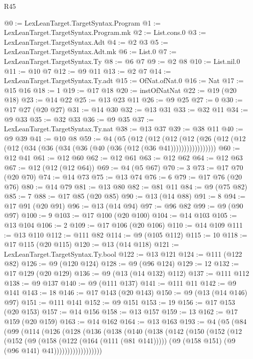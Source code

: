 \begin{lexlean}{R45}
\begin{coremodule}
{{{{{{{{{{{{{{{{{{{{{{{{{{{{{{{{{{{{{{{{{{{{{{{{{{{{{{{{{{{{{{{{{{{{{{{{{{{{{{{{{{{{{{{{{{{@0 := LexLeanTarget.TargetSyntax.Program
@1 := LexLeanTarget.TargetSyntax.Program.mk
@2 := List.cons.{0}
@3 := LexLeanTarget.TargetSyntax.Adt
@4 := @2 @3
@5 := LexLeanTarget.TargetSyntax.Adt.mk
@6 := List.{0}
@7 := LexLeanTarget.TargetSyntax.Ty
@8 := @6 @7
@9 := @2 @8
@10 := List.nil.{0}
@11 := @10 @7
@12 := @9 @11
@13 := @2 @7
@14 := LexLeanTarget.TargetSyntax.Ty.adt
@15 := OfNat.ofNat.{0}
@16 := Nat
@17 := @15 @16
@18 := 1
@19 := @17 @18
@20 := instOfNatNat
@22 := @19 (@20 @18)
@23 := @14 @22
@25 := @13 @23 @11
@26 := @9 @25
@27 := 0
@30 := @17 @27 (@20 @27)
@31 := @14 @30
@32 := @13 @31
@33 := @32 @11
@34 := @9 @33
@35 := @32 @33
@36 := @9 @35
@37 := LexLeanTarget.TargetSyntax.Ty.nat
@38 := @13 @37
@39 := @38 @11
@40 := @9 @39
@41 := @10 @8
@59 := @4
    (@5
      (@12
        (@12
          (@12 (@12 (@26 (@12 (@12 (@12 (@34 (@36 (@34 (@36 (@40 (@36 (@12 (@36 @41)))))))))))))))))
@60 := @12 @41
@61 := @12 @60
@62 := @12 @61
@63 := @12 @62
@64 := @12 @63
@67 := @12 (@12 (@12 @64))
@69 := @4 (@5 @67)
@70 := 3
@73 := @17 @70 (@20 @70)
@74 := @14 @73
@75 := @13 @74
@76 := 6
@79 := @17 @76 (@20 @76)
@80 := @14 @79
@81 := @13 @80
@82 := @81 @11
@84 := @9 (@75 @82)
@85 := 7
@88 := @17 @85 (@20 @85)
@90 := @13 (@14 @88)
@91 := 8
@94 := @17 @91 (@20 @91)
@96 := @13 (@14 @94)
@97 := @96 @82
@99 := @9 (@90 @97)
@100 := 9
@103 := @17 @100 (@20 @100)
@104 := @14 @103
@105 := @13 @104
@106 := 2
@109 := @17 @106 (@20 @106)
@110 := @14 @109
@111 := @13 @110
@112 := @111 @82
@114 := @9 (@105 @112)
@115 := 10
@118 := @17 @115 (@20 @115)
@120 := @13 (@14 @118)
@121 := LexLeanTarget.TargetSyntax.Ty.bool
@122 := @13 @121
@124 := @111 (@122 @82)
@126 := @9 (@120 @124)
@128 := @9 (@96 @124)
@129 := 12
@132 := @17 @129 (@20 @129)
@136 := @9 (@13 (@14 @132) @112)
@137 := @111 @112
@138 := @9 @137
@140 := @9 (@111 @137)
@141 := @111 @11
@142 := @9 @141
@143 := 18
@146 := @17 @143 (@20 @143)
@150 := @9 (@13 (@14 @146) @97)
@151 := @111 @141
@152 := @9 @151
@153 := 19
@156 := @17 @153 (@20 @153)
@157 := @14 @156
@158 := @13 @157
@159 := 13
@162 := @17 @159 (@20 @159)
@163 := @14 @162
@164 := @13 @163
@193 := @4
    (@5
      (@84
        (@99
          (@114
            (@126
              (@128
                (@136
                  (@138
                    (@140
                      (@138
                        (@142
                          (@150
                            (@152
                              (@12
                                (@152
                                  (@9
                                    (@158 (@122 (@164 (@111 (@81 @141)))))
                                    (@9 (@158 @151) (@9 (@96 @141) @41))))))))))))))))))
}}}}}}}}}}}}}}}}}}}}}}}}}}}}}}}}}}}}}}}}}}}}}}}}}}}}}}}}}}}}}}}}}}}}}}}}}}}}}}}}}}}}}}}}}}}
\end{coremodule}
\end{lexlean}
